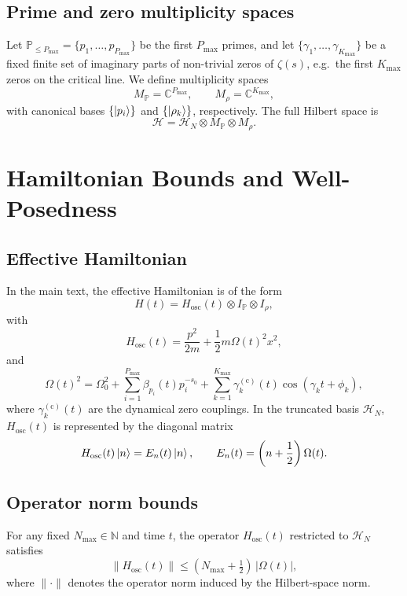 \documentclass[11pt]{article}
\begin{document}
\subsection{Prime and zero multiplicity spaces}

Let $\mathbb{P}_{\le P_{\max}} = \{p_1,\dots,p_{P_{\max}}\}$ be the first $P_{\max}$ primes, and let $\{\gamma_1,\dots,\gamma_{K_{\max}}\}$ be a fixed finite set of imaginary parts of non-trivial zeros of $\zeta(s)$, e.g.\ the first $K_{\max}$ zeros on the critical line. We define multiplicity spaces
\[
M_{\mathbb{P}} = \mathbb{C}^{P_{\max}},\qquad M_{\rho} = \mathbb{C}^{K_{\max}},
\]
with canonical bases $\{\ket{p_i}\}$ and $\{\ket{\rho_k}\}$, respectively. The full Hilbert space is
\[
\mathcal{H} = \mathcal{H}_N \otimes M_{\mathbb{P}} \otimes M_{\rho}.
\]

\section{Hamiltonian Bounds and Well-Posedness}

\subsection{Effective Hamiltonian}

In the main text, the effective Hamiltonian is of the form
\[
H(t) = H_{\text{osc}}(t) \otimes I_{\mathbb{P}} \otimes I_{\rho},
\]
with
\[
H_{\text{osc}}(t) = \frac{p^2}{2m} + \frac{1}{2} m \Omega(t)^2 x^2,
\]
and
\[
\Omega(t)^2 = \Omega_0^2 + \sum_{i=1}^{P_{\max}} \beta_{p_i}(t) p_i^{-s_0} + \sum_{k=1}^{K_{\max}} \gamma_k^{\mathrm{(c)}}(t) \cos(\gamma_k t + \phi_k),
\]
where $\gamma_k^{\mathrm{(c)}}(t)$ are the dynamical zero couplings. In the truncated basis $\mathcal{H}_N$, $H_{\text{osc}}(t)$ is represented by the diagonal matrix
\[
H_{\text{osc}}(t) \ket{n} = E_n(t)\ket{n}, \qquad E_n(t) = \left(n+\frac{1}{2}\right)\Omega(t).
\]

\subsection{Operator norm bounds}

\begin{lemma}
For any fixed $N_{\max}\in\mathbb{N}$ and time $t$, the operator $H_{\text{osc}}(t)$ restricted to $\mathcal{H}_N$ satisfies
\[
\|H_{\text{osc}}(t)\| \le \left(N_{\max}+\tfrac{1}{2}\right)\, |\Omega(t)|,
\]
where $\|\cdot\|$ denotes the operator norm induced by the Hilbert-space norm.
\end{lemma}
\end{document}
